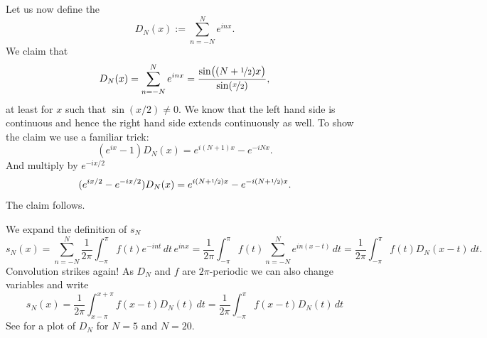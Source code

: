Let us now define the \emph{}
\begin{equation*}
D_N(x) := \sum_{n=-N}^N e^{inx} .
\end{equation*}
We claim that
\begin{equation*}
D_N(x) =
\sum_{n=-N}^N e^{inx}
=
\frac{\sin\bigl( (N+\nicefrac{1}{2})x \bigr)}{\sin(\nicefrac{x}{2})} ,
\end{equation*}
at least for $x$ such that $\sin(x/2) \not= 0$.  We know that the left hand
side is continuous and hence the right hand side extends continuously as well.
To show the claim
we use a familiar trick:
\begin{equation*}
(e^{ix}-1) D_N(x) = e^{i(N+1)x} - e^{-iNx} .
\end{equation*}
And multiply by $e^{-ix/2}$
\begin{equation*}
(e^{ix/2}-e^{-ix/2}) D_N(x) = e^{i(N+\nicefrac{1}{2})x} -
e^{-i(N+\nicefrac{1}{2})x} .
\end{equation*}
The claim follows.

We expand the definition of $s_N$
\begin{equation*}
s_N(x) = 
\sum_{n=-N}^N \frac{1}{2\pi} \int_{-\pi}^\pi f(t) e^{-int} \, dt \, e^{inx}
=
\frac{1}{2\pi} \int_{-\pi}^\pi f(t) \sum_{n=-N}^N e^{in(x-t)} \, dt
=
\frac{1}{2\pi} \int_{-\pi}^\pi f(t) D_N(x-t) \, dt .
\end{equation*}
Convolution strikes again!
As $D_N$ and $f$ are $2\pi$-periodic we can also change variables and write 
\begin{equation*}
s_N(x) = 
\frac{1}{2\pi} \int_{x-\pi}^{x+\pi} f(x-t) D_N(t) \, dt
=
\frac{1}{2\pi} \int_{-\pi}^\pi f(x-t) D_N(t) \, dt
\end{equation*}
See  for a plot of $D_N$ for $N=5$ and $N=20$.

